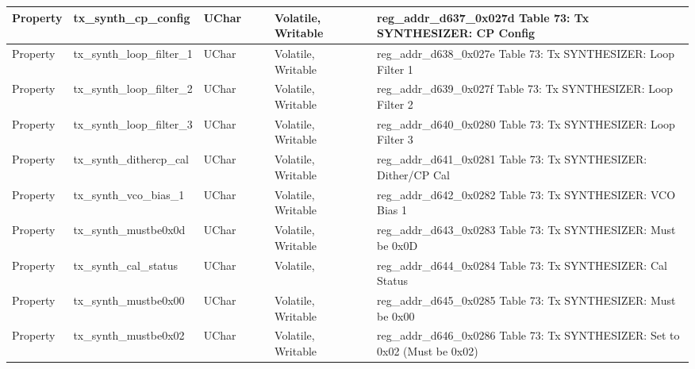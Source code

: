 \documentclass{article}
\begin{document}
\begin{scriptsize}
\begin{longtable}{|p{2cm}|p{5cm}|p{1cm}|p{2cm}|p{2cm}|p{1.75cm}|p{1.5cm}|p{5.1cm}|}
  \hline
  Property & tx\_synth\_cp\_config                                    & UChar &                  &                  & Volatile,  Writable &         & reg\_addr\_d637\_0x027d Table 73: Tx SYNTHESIZER: CP Config \\
  \hline
  Property & tx\_synth\_loop\_filter\_1                               & UChar &                  &                  & Volatile,  Writable &         & reg\_addr\_d638\_0x027e Table 73: Tx SYNTHESIZER: Loop Filter 1 \\
  \hline
  Property & tx\_synth\_loop\_filter\_2                               & UChar &                  &                  & Volatile,  Writable &         & reg\_addr\_d639\_0x027f Table 73: Tx SYNTHESIZER: Loop Filter 2 \\
  \hline
  Property & tx\_synth\_loop\_filter\_3                               & UChar &                  &                  & Volatile,  Writable &         & reg\_addr\_d640\_0x0280 Table 73: Tx SYNTHESIZER: Loop Filter 3 \\
  \hline
  Property & tx\_synth\_dithercp\_cal                                 & UChar &                  &                  & Volatile,  Writable &         & reg\_addr\_d641\_0x0281 Table 73: Tx SYNTHESIZER: Dither/CP Cal \\
  \hline
  Property & tx\_synth\_vco\_bias\_1                                  & UChar &                  &                  & Volatile,  Writable &         & reg\_addr\_d642\_0x0282 Table 73: Tx SYNTHESIZER: VCO Bias 1 \\
  \hline
  Property & tx\_synth\_mustbe0x0d                                    & UChar &                  &                  & Volatile,  Writable &         & reg\_addr\_d643\_0x0283 Table 73: Tx SYNTHESIZER: Must be 0x0D \\
  \hline
  Property & tx\_synth\_cal\_status                                   & UChar &                  &                  & Volatile,           &         & reg\_addr\_d644\_0x0284 Table 73: Tx SYNTHESIZER: Cal Status \\
  \hline
  Property & tx\_synth\_mustbe0x00                                    & UChar &                  &                  & Volatile,  Writable &         & reg\_addr\_d645\_0x0285 Table 73: Tx SYNTHESIZER: Must be 0x00 \\
  \hline
  Property & tx\_synth\_mustbe0x02                                    & UChar &                  &                  & Volatile,  Writable &         & reg\_addr\_d646\_0x0286 Table 73: Tx SYNTHESIZER: Set to 0x02 (Must be 0x02) \\

\end{longtable}
\end{scriptsize}
\end{document}
